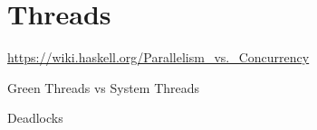 \section{Threads}
\label{section: Threads}

\url{https://wiki.haskell.org/Parallelism_vs._Concurrency}

Green Threads vs System Threads

Deadlocks